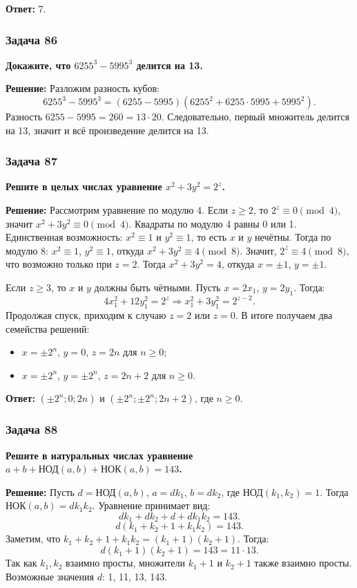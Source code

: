 \documentclass[12pt, a4paper]{article}
\begin{document}
\textbf{Ответ:} 7.

\subsubsection*{Задача 86}
\textbf{Докажите, что $6255^3 - 5995^3$ делится на 13.}

\textbf{Решение:}
Разложим разность кубов:
\[
6255^3 - 5995^3 = (6255 - 5995)(6255^2 + 6255 \cdot 5995 + 5995^2).
\]
Разность \(6255 - 5995 = 260 = 13 \cdot 20\). Следовательно, первый множитель делится на 13, значит и всё произведение делится на 13.

\subsubsection*{Задача 87}
\textbf{Решите в целых числах уравнение $x^2 + 3y^2 = 2^z$.}

\textbf{Решение:}
Рассмотрим уравнение по модулю 4. Если $z \ge 2$, то $2^z \equiv 0 \pmod{4}$, значит $x^2 + 3y^2 \equiv 0 \pmod{4}$. Квадраты по модулю 4 равны 0 или 1. Единственная возможность: $x^2 \equiv 1$ и $y^2 \equiv 1$, то есть $x$ и $y$ нечётны. Тогда по модулю 8: $x^2 \equiv 1$, $y^2 \equiv 1$, откуда $x^2 + 3y^2 \equiv 4 \pmod{8}$. Значит, $2^z \equiv 4 \pmod{8}$, что возможно только при $z = 2$. Тогда $x^2 + 3y^2 = 4$, откуда $x = \pm 1$, $y = \pm 1$.

Если $z \ge 3$, то $x$ и $y$ должны быть чётными. Пусть $x = 2x_1$, $y = 2y_1$. Тогда:
\[
4x_1^2 + 12y_1^2 = 2^z \Rightarrow x_1^2 + 3y_1^2 = 2^{z-2}.
\]
Продолжая спуск, приходим к случаю $z=2$ или $z=0$. В итоге получаем два семейства решений:
\begin{itemize}
    \item $x = \pm 2^n$, $y = 0$, $z = 2n$ для $n \ge 0$;
    \item $x = \pm 2^n$, $y = \pm 2^n$, $z = 2n+2$ для $n \ge 0$.
\end{itemize}

\textbf{Ответ:} $(\pm 2^n; 0; 2n)$ и $(\pm 2^n; \pm 2^n; 2n+2)$, где $n \ge 0$.

\subsubsection*{Задача 88}
\textbf{Решите в натуральных числах уравнение $a + b + \text{НОД}(a,b) + \text{НОК}(a,b) = 143$.}

\textbf{Решение:}
Пусть $d = \text{НОД}(a,b)$, $a = d k_1$, $b = d k_2$, где $\text{НОД}(k_1, k_2) = 1$. Тогда $\text{НОК}(a,b) = d k_1 k_2$. Уравнение принимает вид:
\[
d k_1 + d k_2 + d + d k_1 k_2 = 143.
\]
\[
d(k_1 + k_2 + 1 + k_1 k_2) = 143.
\]
Заметим, что $k_1 + k_2 + 1 + k_1 k_2 = (k_1+1)(k_2+1)$. Тогда:
\[
d(k_1+1)(k_2+1) = 143 = 11 \cdot 13.
\]
Так как $k_1, k_2$ взаимно просты, множители $k_1+1$ и $k_2+1$ также взаимно просты. Возможные значения $d$: 1, 11, 13, 143.
\end{document}
